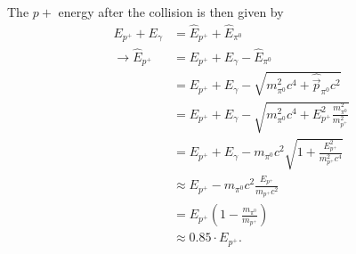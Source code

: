 \documentclass[10pt,a4paper]{article}
\theoremstyle{definition}
\begin{document}
\begin{enumerate}
    The $p+$ energy after the collision is then given by 
    \begin{align}
        E_{p^+}+E_\gamma&=\hat E_{p^+}+\hat E_{\pi^0}\\
        \rightarrow\hat E_{p^+}&=E_{p^+}+E_\gamma - \hat E_{\pi^0}\\
        &=E_{p^+}+E_\gamma - \sqrt{m_{\pi^0}^2c^4+\hat{\vec{p}}_{\pi^0}c^2}\\
        &=E_{p^+}+E_\gamma - \sqrt{m_{\pi^0}^2c^4+E_{p^+}^2\frac{m_{\pi^0}^2}{m_{p^+}^2}}\\
        &=E_{p^+}+E_\gamma - m_{\pi^0}c^2\sqrt{1+\frac{E_{p^+}^2}{m_{p^+}^2c^4}}\\
        &\approx E_{p^+} - m_{\pi^0}c^2\frac{E_{p^+}}{m_{p^+}c^2}\\
        &=E_{p^+}\left(1-\frac{m_{\pi^0}}{m_{p^+}}\right)\\
        &\approx0.85\cdot E_{p^+}.
    \end{align}
\end{enumerate}
\end{document}

